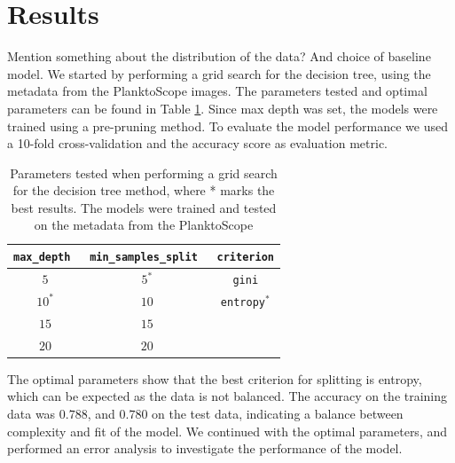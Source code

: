 \section{Results}\label{sec:results}
Mention something about the distribution of the data? And choice of baseline model.
%
We started by performing a grid search for the decision tree, using the metadata from the PlanktoScope images. The parameters tested and optimal parameters can be found in Table \ref{tab:params_tree}. Since max depth was set, the models were trained using a pre-pruning method. To evaluate the model performance we used a 10-fold cross-validation and the accuracy score as evaluation metric.
\begin{table}[h]
    \centering
    \begin{tabular}{ccc}
        \hline
        \verb|max_depth| \, & \verb|min_samples_split| \, & \verb|criterion| \\
        \hline 
        $5$ & $5^*$ & \verb|gini| \\
        $10^*$ & $10$ & \verb|entropy|$^*$ \\
        $15$ & $15$ & \\
        $20$ & $20$ & \\
        \hline
    \end{tabular}
    \caption{Parameters tested when performing a grid search for the decision tree method, where * marks the best results. The models were trained and tested on the metadata from the PlanktoScope}
    \label{tab:params_tree}
\end{table}

The optimal parameters show that the best criterion for splitting is entropy, which can be expected as the data is not balanced. The accuracy on the training data was $0.788$, and $0.780$ on the test data, indicating a balance between complexity and fit of the model. 
We continued with the optimal parameters, and performed an error analysis to investigate the performance of the model.

